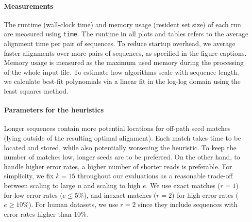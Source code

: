 \paragraph{Measurements}
The runtime (wall-clock time) and memory usage (resident set size) of each run
are measured using \texttt{time}. The runtime in all plots and tables refers to
the average alignment time per pair of sequences. To reduce startup overhead,
we average faster alignments over more pairs of sequences, as specified in the figure
captions. Memory usage is measured as the maximum used memory during the
processing of the whole input file. To estimate how algorithms scale with
sequence length, we calculate best-fit polynomials via a linear fit in the
log-log domain using the least squares method.

\paragraph{Parameters for the \A heuristics}
Longer sequences contain more potential locations for off-path seed matches
(\ie lying outside of the resulting optimal alignment). Each match takes time
to be located and stored, while also potentially worsening the heuristic. To
keep the number of matches low, longer seeds are to be preferred. On the other
hand, to handle higher error rates, a higher number of shorter reads is
preferable. For simplicity, we fix $k{=}15$ throughout our evaluations as a
reasonable trade-off between scaling to large $n$ and scaling to high $e$. We
use exact matches ($r{=}1$) for low error rates ($e {\leq} 5\%$), and inexact
matches ($r{=}2$) for high error rates ($e{\geq}10\%$). For human
datasets, we use $r{=}2$ since they include sequences with error rates
higher than $10\%$.
